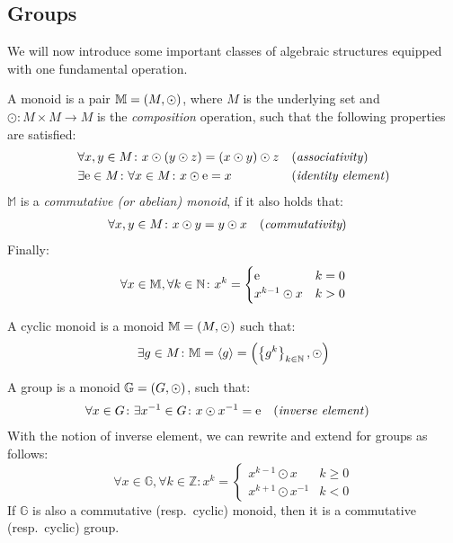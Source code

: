 \subsection{Groups}
We will now introduce some important classes of algebraic structures equipped with one fundamental 
operation. 
\begin{definition}[Monoid]
  A monoid is a pair \(\mathbb{M} = \left(M, \odot\right) \), where \(M\) is the 
  underlying set and \(\odot\colon M \times M \to M\) is the \emph{composition} 
  operation, such that the following properties are satisfied: 
  \begin{align*}
    & \forall x,y \in M\colon x \odot \left(y \odot z\right) = \left(x \odot y\right) \odot z
      && \textnormal{(\emph{associativity})} \\
    & \exists \mathrm{e} \in M\colon \forall x \in M\colon x \odot \mathrm{e} = x
      && \textnormal{(\emph{identity element})}
  \end{align*}
  \(\mathbb{M}\) is a \emph{commutative (or abelian) monoid}, if it also holds that:
  \begin{align*}
    & \forall x,y \in M\colon x \odot y = y \odot x && (\emph{commutativity})
  \end{align*}
  Finally:
  \begin{equation}\label{eq:exponentiation}    
    \forall x \in \mathbb{M}, \forall k \in \mathbb{N}\colon x^{k} = 
    \begin{cases}
      \mathrm{e} & k = 0 \\
      x^{k-1} \odot x & k > 0
    \end{cases}
  \end{equation}
\end{definition}

\begin{definition}
  A cyclic monoid is a monoid \(\mathbb{M} = \left(M, \odot\right)\) such that:
  \[\exists g \in M\colon \mathbb{M} = \left\langle g\right\rangle = 
  \left(\left\{g^k\right\}_{k \in \mathbb{N}}, \odot\right) \]  
\end{definition}

\begin{definition}[Group]
  A group is a monoid \(\mathbb{G} = \left(G, \odot\right) \), such that: 
  \begin{align*}    
    & \forall x \in G\colon \exists x^{-1} \in G\colon x \odot x^{-1} = \mathrm{e}
    && \textnormal{(\emph{inverse element})}
  \end{align*}
  With the notion of inverse element, we can rewrite and extend  
  for groups as follows:
  \[
    \forall x \in \mathbb{G},\forall k \in \mathbb{Z}\colon x^k =
    \begin{cases}
      x^{k-1} \odot x & k \ge 0 \\
      x^{k+1} \odot x^{-1} & k < 0
    \end{cases}
  \]
  If \(\mathbb{G}\) is also a commutative (resp.\ cyclic) monoid, then it is a 
  commutative (resp.\ cyclic) group.
\end{definition}

